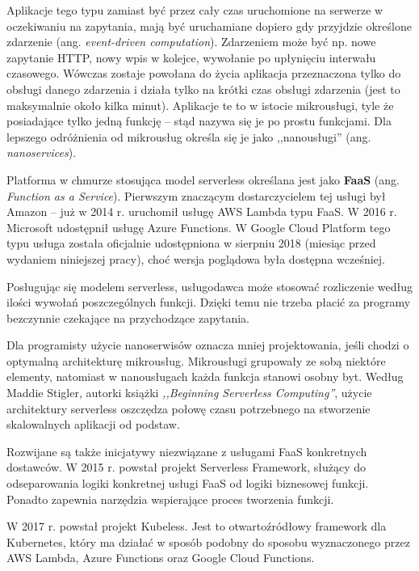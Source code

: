 \documentclass[12pt,a4paper,twoside,titlepage,openright]{book}
\begin{document}
Aplikacje tego typu zamiast być przez cały czas uruchomione na serwerze w oczekiwaniu na zapytania, mają być uruchamiane dopiero gdy przyjdzie określone zdarzenie (ang. \textit{event-driven computation}). Zdarzeniem może być np. nowe zapytanie HTTP, nowy wpis w kolejce, wywołanie po upłynięciu interwału czasowego. Wówczas zostaje powołana do życia aplikacja przeznaczona tylko do obsługi danego zdarzenia i działa tylko na krótki czas obsługi zdarzenia (jest to maksymalnie około kilka minut). Aplikacje te to w istocie mikrousługi, tyle że posiadające tylko jedną funkcję -- stąd nazywa się je po prostu funkcjami. Dla lepszego odróżnienia od mikrousług określa się je jako ,,nanousługi'' (ang. \textit{nanoservices}). \cite{serverlessMaddie, ccResearchSpringer, distributedSystems}

Platforma w chmurze stosująca model serverless określana jest jako \textbf{FaaS} (ang. \textit{Function as a Service}). Pierwszym znaczącym dostarczycielem tej usługi był Amazon -- już w 2014 r. uruchomił usługę AWS Lambda typu FaaS. W 2016 r. Microsoft udostępnił usługę Azure Functions. W Google Cloud Platform tego typu usługa została oficjalnie udostępniona w sierpniu 2018 (miesiąc przed wydaniem niniejszej pracy), choć wersja poglądowa była dostępna wcześniej. 

Posługując się modelem serverless, usługodawca może stosować rozliczenie według ilości wywołań poszczególnych funkcji. Dzięki temu nie trzeba płacić za programy bezczynnie czekające na przychodzące zapytania.

Dla programisty użycie nanoserwisów oznacza mniej projektowania, jeśli chodzi o optymalną architekturę mikrousług. Mikrousługi grupowały ze sobą niektóre elementy, natomiast w nanousługach każda funkcja stanowi osobny byt. Według Maddie Stigler, autorki książki \textit{,,Beginning Serverless Computing''}, użycie architektury serverless oszczędza połowę czasu potrzebnego na stworzenie skalowalnych aplikacji od podstaw.\cite{serverlessMaddie}

Rozwijane są także inicjatywy niezwiązane z usługami FaaS konkretnych dostawców. W 2015 r. powstał projekt Serverless Framework,\cite{siteServerlessFramework} służący do odseparowania logiki konkretnej usługi FaaS od logiki biznesowej funkcji. Ponadto zapewnia narzędzia wspierające proces tworzenia funkcji. 

W 2017 r. powstał projekt Kubeless.\cite{siteKubelessReleases} Jest to otwartoźródłowy framework dla Kubernetes, który ma działać w sposób podobny do sposobu wyznaczonego przez AWS Lambda, Azure Functions oraz Google Cloud Functions.\cite{distributedSystems} 
\end{document}
